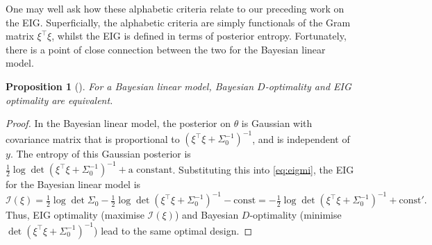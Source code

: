 \documentclass[a4paper, 10pt]{report}
\theoremstyle{plain}
\newtheorem{proposition}[theorem]{Proposition}
\begin{document}
	One may well ask how these alphabetic criteria relate to our preceding work on the EIG. Superficially, the alphabetic criteria are simply functionals of the Gram matrix $\xi^\top \xi$, whilst the EIG is defined in terms of posterior entropy.
	Fortunately, there is a point of close connection between the two for the Bayesian linear model.
	\begin{proposition}[\citet{chaloner1995}]
		For a Bayesian linear model, Bayesian $D$-optimality and EIG optimality are equivalent.
	\end{proposition}
	\begin{proof}
		In the Bayesian linear model, the posterior on $\theta$ is Gaussian with covariance matrix that is proportional to $(\xi^\top \xi + \Sigma_0^{-1})^{-1}$, and is independent of $y$. 
		The entropy of this Gaussian posterior is $\tfrac{1}{2}\log \det (\xi^\top \xi + \Sigma_0^{-1})^{-1} + \text{a constant}$. Substituting this into \eqref{eq:eigmi}, the EIG for the Bayesian linear model is
		\begin{equation}
		\mathcal{I}(\xi) = \tfrac{1}{2}\log \det \Sigma_0 - \tfrac{1}{2}\log \det (\xi^\top \xi + \Sigma_0^{-1})^{-1} - \text{const} = - \tfrac{1}{2}\log \det (\xi^\top \xi + \Sigma_0^{-1})^{-1} + \text{const}'.
		\end{equation}
		Thus, EIG optimality (maximise $\mathcal{I}(\xi)$) and Bayesian $D$-optimality (minimise $\det (\xi^\top \xi + \Sigma_0^{-1})^{-1}$) lead to the same optimal design.
	\end{proof}
	
\end{document}
